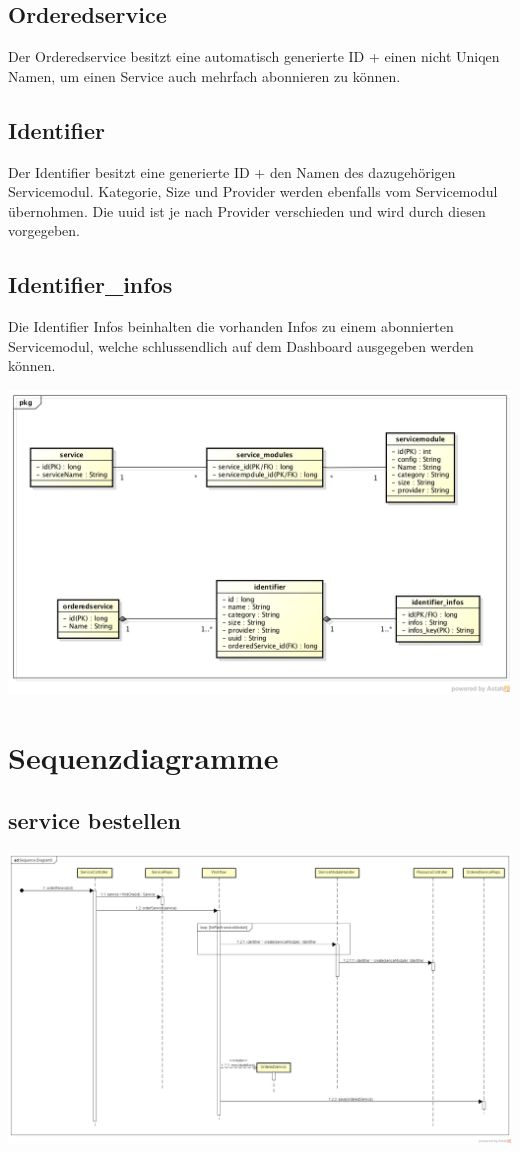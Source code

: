 \subsection{Orderedservice}
Der Orderedservice besitzt eine automatisch generierte ID + einen nicht Uniqen 
Namen, um einen Service auch mehrfach abonnieren zu können.

\subsection{Identifier}
Der Identifier besitzt eine generierte ID + den Namen des dazugehörigen 
Servicemodul.
Kategorie, Size und Provider werden ebenfalls vom Servicemodul übernohmen.
Die uuid ist je nach Provider verschieden und wird durch diesen vorgegeben.

\subsection{Identifier_infos}
Die Identifier Infos beinhalten die vorhanden Infos zu einem abonnierten 
Servicemodul, welche schlussendlich auf dem Dashboard ausgegeben werden können.

\includegraphics[width=\textwidth]{./05_Design/04_Architektur/Datenmodell}

\section{Sequenzdiagramme}
\subsection{service bestellen}

\begin{center}
\includegraphics[width=\textwidth]{./05_Design/04_Architektur/orderService}
\end{center}
